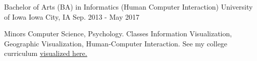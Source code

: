 \begin{cventries}
  \cventry
    {Bachelor of Arts (BA) in Informatics (Human Computer Interaction)}
    {University of Iowa}
    {Iowa City, IA}
    {Sep. 2013 - May 2017}
    {
      \begin{cvitemED}
          \cvskillED
            {Minors}
            {Computer Science, Psychology.}
          \cvskillED
            {Classes}
            {Information Visualization, Geographic Visualization, Human-Computer Interaction. See my college curriculum \href{https://www.github.com/ryan-p-larson/college-sankey/}{visualized here.}}
      \end{cvitemED}
    }
\end{cventries}
